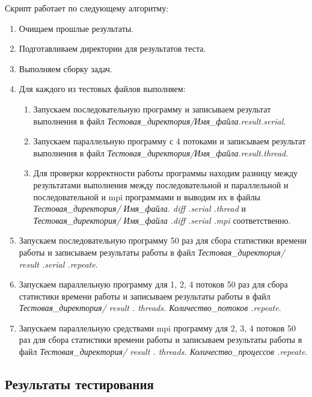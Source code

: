 \documentclass[12pt,a4paper]{report}
\begin{document}
				Скрипт работает по следующему алгоритму:
				\begin{enumerate}
					\item Очищаем прошлые результаты.
					\item Подготавливаем директории для результатов теста.
					\item Выполняем сборку задач.
					\item Для каждого из тестовых файлов выполняем:
						\begin{enumerate}
							\item Запускаем последовательную программу и записываем результат выполнения в файл \textit{Тестовая\_директория/Имя\_файла.result.serial}.
							\item Запускаем параллельную программу с 4 потоками и записываем результат выполнения в файл \textit{Тестовая\_директория/Имя\_файла.result.thread}.
							\item Для проверки корректности работы программы находим разницу между результатами выполнения между последовательной и параллельной и последовательной и mpi программами и выводим их в файлы \textit{Тестовая\_директория/ Имя\_файла. diff .serial .thread} и \textit{Тестовая\_директория/ Имя\_файла .diff .serial .mpi} соответственно.
						\end{enumerate}
					\item Запускаем последовательную программу 50 раз для сбора статистики времени работы и записываем результаты работы в файл \textit{Тестовая\_директория/ result .serial .repeate}.
					\item Запускаем параллельную программу для 1, 2, 4 потоков 50 раз для сбора статистики времени работы и записываем результаты работы в файл \textit{Тестовая\_директория/ result . threads. Количество\_потоков .repeate}.
					\item Запускаем параллельную средствами mpi программу для 2, 3, 4 потоков 50 раз для сбора статистики времени работы и записываем результаты работы в файл \textit{Тестовая\_директория/ result . threads. Количество\_процессов .repeate}.
				\end{enumerate}
			\subsection{Результаты тестирования}
				
\end{document}
